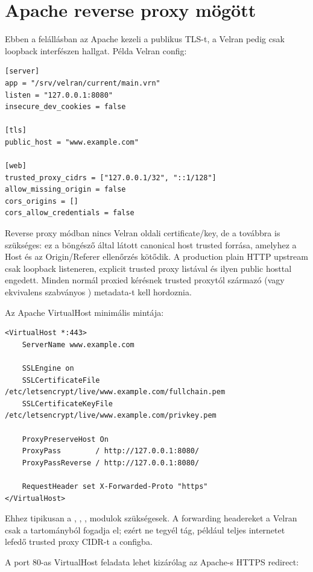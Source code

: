 \section{Apache reverse proxy mögött}

Ebben a felállásban az Apache kezeli a publikus TLS-t, a Velran pedig csak loopback interfészen hallgat. Példa Velran config:

\begin{lstlisting}
[server]
app = "/srv/velran/current/main.vrn"
listen = "127.0.0.1:8080"
insecure_dev_cookies = false

[tls]
public_host = "www.example.com"

[web]
trusted_proxy_cidrs = ["127.0.0.1/32", "::1/128"]
allow_missing_origin = false
cors_origins = []
cors_allow_credentials = false
\end{lstlisting}

Reverse proxy módban nincs Velran oldali certificate/key, de a  továbbra is szükséges: ez a böngésző által látott canonical host trusted forrása, amelyhez a Host és az Origin/Referer ellenőrzés kötődik. A production plain HTTP upstream csak loopback listeneren, explicit trusted proxy listával és ilyen public hosttal engedett. Minden normál proxied kérésnek trusted proxytól származó  (vagy ekvivalens szabványos ) metadata-t kell hordoznia.

Az Apache VirtualHost minimális mintája:

\begin{lstlisting}
<VirtualHost *:443>
    ServerName www.example.com

    SSLEngine on
    SSLCertificateFile /etc/letsencrypt/live/www.example.com/fullchain.pem
    SSLCertificateKeyFile /etc/letsencrypt/live/www.example.com/privkey.pem

    ProxyPreserveHost On
    ProxyPass        / http://127.0.0.1:8080/
    ProxyPassReverse / http://127.0.0.1:8080/

    RequestHeader set X-Forwarded-Proto "https"
</VirtualHost>
\end{lstlisting}

Ehhez tipikusan a , , ,  modulok szükségesek. A forwarding headereket a Velran csak a  tartományból fogadja el; ezért ne tegyél tág, például teljes internetet lefedő trusted proxy CIDR-t a configba.

A port 80-as VirtualHost feladata lehet kizárólag az Apache-s HTTPS redirect:

